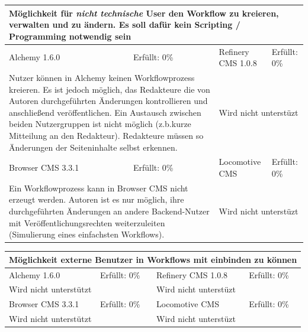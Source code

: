 \begin{tabular}[!ht]{|l|l|l|l|}
\hline
\multicolumn{4}{|p{15cm}|}{\textbf{Möglichkeit für \emph{nicht technische} User den Workflow zu kreieren, verwalten und zu ändern. Es soll dafür kein Scripting / Programming notwendig sein}} \\
\hline
  Alchemy 1.6.0 & \cellcolor{red}Erfüllt: 0\% & Refinery CMS 1.0.8 & \cellcolor{red}Erfüllt: 0\% \\
  \hline
  \multicolumn{2}{|p{7.5cm}|}{Nutzer können in Alchemy keinen Workflowprozess kreieren. Es ist jedoch möglich, das Redakteure die  von Autoren durchgeführten Änderungen kontrollieren und anschließend veröffentlichen.
Ein Austausch zwischen beiden Nutzergruppen ist nicht möglich (z.b.kurze Mitteilung an den Redakteur). Redakteure müssen so Änderungen der Seiteninhalte selbst erkennen.} & \multicolumn{2}{p{7.5cm}|}{Wird nicht unterstüzt} \\
  \hline
  Browser CMS 3.3.1 & \cellcolor{red}Erfüllt: 0\% & Locomotive CMS & \cellcolor{red}Erfüllt: 0\% \\
  \hline
  \multicolumn{2}{|p{7.5cm}|}{Ein Workflowprozess kann in Browser CMS nicht erzeugt werden. Autoren ist es nur möglich, ihre durchgeführten Änderungen an andere Backend-Nutzer mit Veröffentlichungsrechten weiterzuleiten (Simulierung eines einfachsten Workflows).} & \multicolumn{2}{p{7.5cm}|}{Wird nicht unterstüzt} \\
\hline
\end{tabular}
\newline
\newline
\newline
\begin{tabular}[!ht]{|l|l|l|l|}
\hline
\multicolumn{4}{|p{15cm}|}{\textbf{Möglichkeit externe Benutzer in Workflows mit einbinden zu können}} \\
\hline
  Alchemy 1.6.0 & \cellcolor{red}Erfüllt: 0\% & Refinery CMS 1.0.8 & \cellcolor{red}Erfüllt: 0\% \\
  \hline
  \multicolumn{2}{|p{7.5cm}|}{Wird nicht unterstützt} & \multicolumn{2}{p{7.5cm}|}{Wird nicht unterstüzt} \\
  \hline
  Browser CMS 3.3.1 & \cellcolor{red}Erfüllt: 0\% & Locomotive CMS & \cellcolor{red}Erfüllt: 0\% \\
  \hline
  \multicolumn{2}{|p{7.5cm}|}{Wird nicht unterstützt} & \multicolumn{2}{p{7.5cm}|}{Wird nicht unterstüzt} \\
\hline
\end{tabular}
\newline
